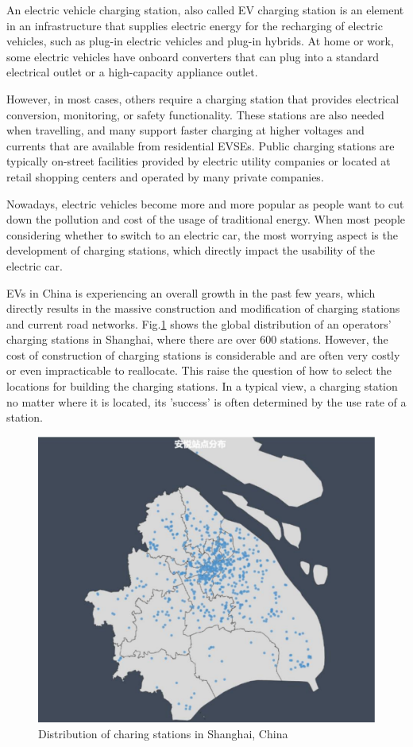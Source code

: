 An electric vehicle charging station, also called EV charging station is an element in an infrastructure that supplies electric energy for the recharging of electric vehicles, such as plug-in electric vehicles and plug-in hybrids. At home or work, some electric vehicles have onboard converters that can plug into a standard electrical outlet or a high-capacity appliance outlet. 

However, in most cases, others require a charging station that provides electrical conversion, monitoring, or safety functionality. These stations are also needed when travelling, and many support faster charging at higher voltages and currents that are available from residential EVSEs. Public charging stations are typically on-street facilities provided by electric utility companies or located at retail shopping centers and operated by many private companies.

Nowadays, electric vehicles become more and more popular as people want to cut down the pollution and cost of the usage of traditional energy. When most people considering whether to switch to an electric car, the most worrying aspect is the development of charging stations, which directly impact the usability of the electric car.

EVs in China is experiencing an overall growth in the past few years, which directly results in the massive construction and modification of charging stations and current road networks. Fig.\ref{fig1} shows the global distribution of an operators' charging stations in Shanghai, where there are over 600 stations. However, the cost of construction of charging stations is considerable and are often very costly or even impracticable to reallocate. This raise the question of how to select the locations for building the charging stations. In a typical view, a charging station no matter where it is located, its 'success' is often determined by the use rate of a station.

\begin{figure}[!htp]
	\includegraphics[width=\columnwidth]{./figures/areas.pdf}
	\centering
	\caption{Distribution of charing stations in Shanghai, China}
	\label{fig1}
\end{figure}  

